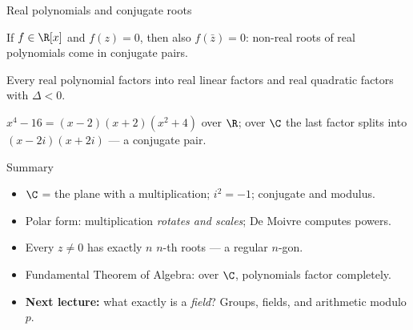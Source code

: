 \begin{frame}{Real polynomials and conjugate roots}
\begin{theorem}
If $f \in \R[x]$ and $f(z) = 0$, then also $f(\bar z) = 0$: non-real roots of
real polynomials come in conjugate pairs.
\end{theorem}

\pause

\begin{corollary}
Every real polynomial factors into real linear factors and real quadratic
factors with $\Delta < 0$.
\end{corollary}

\pause

\begin{example}
$x^4 - 16 = (x-2)(x+2)(x^2+4)$ over $\R$; over $\C$ the last factor splits
into $(x-2i)(x+2i)$ — a conjugate pair.
\end{example}
\end{frame}

\begin{frame}{Summary}
\begin{itemize}
\item $\C$ = the plane with a multiplication; $i^2 = -1$; conjugate and modulus.
\pause
\item Polar form: multiplication \emph{rotates and scales}; De Moivre computes powers.
\pause
\item Every $z \neq 0$ has exactly $n$ $n$-th roots — a regular $n$-gon.
\pause
\item Fundamental Theorem of Algebra: over $\C$, polynomials factor completely.
\pause
\item \textbf{Next lecture:} what exactly is a \emph{field}? Groups, fields, and
arithmetic modulo $p$.
\end{itemize}
\end{frame}
